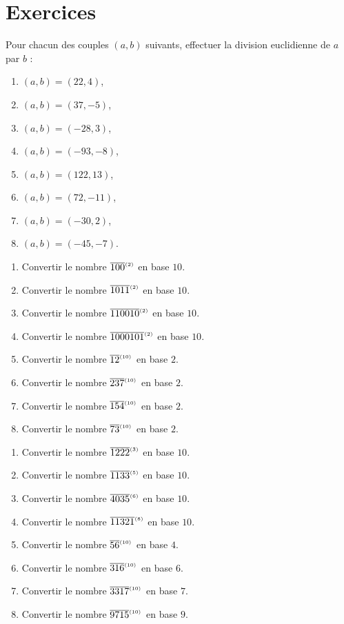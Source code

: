 \section{Exercices}
%
\begin{exo}\label{exo:arith-1}
	Pour chacun des couples $(a,b)$ suivants, effectuer la division euclidienne de $a$ par $b$ :
		\begin{enumerate}
			\item $(a,b) = (22,4)$,
			\item $(a,b) = (37,-5)$,
			\item $(a,b) = (-28,3)$,
			\item $(a,b) = (-93,-8)$,
			\item $(a,b) = (122,13)$,
			\item $(a,b) = (72,-11)$,
			\item $(a,b) = (-30,2)$,
			\item $(a,b) = (-45,-7)$.
		\end{enumerate}
\end{exo}
%
\begin{exo}\label{exo:arith-2}
	\begin{enumerate}
		\item Convertir le nombre $\overline{100}^{_{(2)}}$ en base $ 10 $.
		\item Convertir le nombre $\overline{1011}^{_{(2)}}$ en base $ 10 $.
		\item Convertir le nombre $\overline{110010}^{_{(2)}}$ en base $ 10 $.
		\item Convertir le nombre $\overline{1000101}^{_{(2)}}$ en base $ 10 $.
		\item Convertir le nombre $\overline{12}^{_{(10)}}$ en base $ 2 $.
		\item Convertir le nombre $\overline{237}^{_{(10)}}$ en base $ 2 $.
		\item Convertir le nombre $\overline{154}^{_{(10)}}$ en base $ 2 $.
		\item Convertir le nombre $\overline{73}^{_{(10)}}$ en base $ 2 $.
	\end{enumerate}
\end{exo}
%
\begin{exo}\label{exo:arith-3}
	\begin{enumerate}
		\item Convertir le nombre $\overline{1222}^{_{(3)}}$ en base $ 10 $.
		\item Convertir le nombre $\overline{1133}^{_{(5)}}$ en base $ 10 $.
		\item Convertir le nombre $\overline{4035}^{_{(6)}}$ en base $ 10 $.
		\item Convertir le nombre $\overline{11321}^{_{(8)}}$ en base $ 10 $.
		\item Convertir le nombre $\overline{56}^{_{(10)}}$ en base $ 4 $.
		\item Convertir le nombre $\overline{316}^{_{(10)}}$ en base $ 6 $.
		\item Convertir le nombre $\overline{3317}^{_{(10)}}$ en base $ 7 $.
		\item Convertir le nombre $\overline{9715}^{_{(10)}}$ en base $ 9 $.
	\end{enumerate}
\end{exo}
